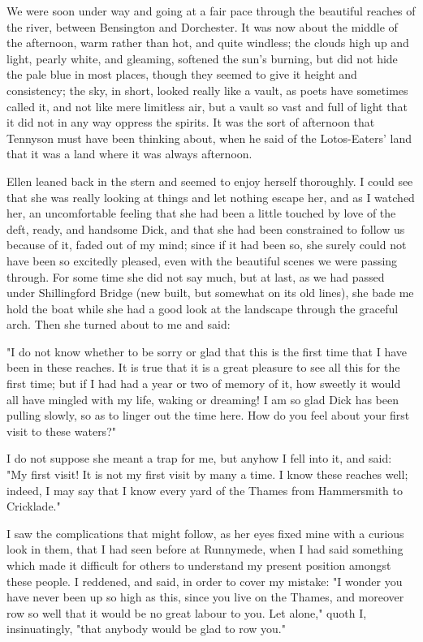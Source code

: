 We were soon under way and going at a fair pace through the beautiful
reaches of the river, between Bensington and Dorchester. It was now
about the middle of the afternoon, warm rather than hot, and quite
windless; the clouds high up and light, pearly white, and gleaming,
softened the sun's burning, but did not hide the pale blue in most
places, though they seemed to give it height and consistency; the sky,
in short, looked really like a vault, as poets have sometimes called it,
and not like mere limitless air, but a vault so vast and full of light
that it did not in any way oppress the spirits. It was the sort of
afternoon that Tennyson must have been thinking about, when he said of
the Lotos-Eaters' land that it was a land where it was always afternoon.

Ellen leaned back in the stern and seemed to enjoy herself thoroughly. I
could see that she was really looking at things and let nothing escape
her, and as I watched her, an uncomfortable feeling that she had been a
little touched by love of the deft, ready, and handsome Dick, and that
she had been constrained to follow us because of it, faded out of my
mind; since if it had been so, she surely could not have been so
excitedly pleased, even with the beautiful scenes we were passing
through. For some time she did not say much, but at last, as we had
passed under Shillingford Bridge (new built, but somewhat on its old
lines), she bade me hold the boat while she had a good look at the
landscape through the graceful arch. Then she turned about to me and
said:

"I do not know whether to be sorry or glad that this is the first time
that I have been in these reaches. It is true that it is a great
pleasure to see all this for the first time; but if I had had a year or
two of memory of it, how sweetly it would all have mingled with my life,
waking or dreaming! I am so glad Dick has been pulling slowly, so as to
linger out the time here. How do you feel about your first visit to
these waters?"

I do not suppose she meant a trap for me, but anyhow I fell into it, and
said: "My first visit! It is not my first visit by many a time. I know
these reaches well; indeed, I may say that I know every yard of the
Thames from Hammersmith to Cricklade."

I saw the complications that might follow, as her eyes fixed mine with a
curious look in them, that I had seen before at Runnymede, when I had
said something which made it difficult for others to understand my
present position amongst these people. I reddened, and said, in order to
cover my mistake: "I wonder you have never been up so high as this,
since you live on the Thames, and moreover row so well that it would be
no great labour to you. Let alone," quoth I, insinuatingly, "that
anybody would be glad to row you."

